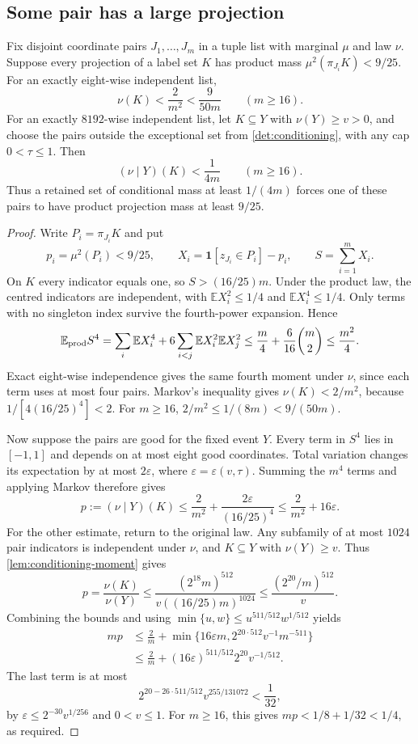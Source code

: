 \documentclass[11pt]{article} \usepackage[utf8]{inputenc}
\theoremstyle{plain} \newtheorem{theorem}{Theorem}[section]
\theoremstyle{definition} \newaliascnt{definition}{theorem}
\newcommand{\ind}{\mathbf{1}}
\begin{document}
\subsection{Some pair has a large projection}

\begin{lemma}\label{lem:pair-projections}
Fix disjoint coordinate pairs $J_1,\ldots,J_m$ in a tuple list with marginal
$\mu$ and law $\nu$. Suppose every projection of a label set $K$ has product
mass $\mu^2(\pi_{J_i}K)<9/25$.
For an exactly eight-wise independent list,
\[
\nu(K)<\frac2{m^2}<\frac9{50m}\qquad(m\ge16).
\]
For an exactly $8192$-wise independent list, let $K\subseteq Y$ with
$\nu(Y)\ge v>0$, and choose the pairs outside the exceptional set from
\cref{det:conditioning}, with any cap $0<\tau\le1$. Then
\[
(\nu\mid Y)(K)<\frac1{4m}\qquad(m\ge16).
\]
Thus a retained set of conditional mass at least $1/(4m)$ forces one of
these pairs to have product projection mass at least $9/25$.
\end{lemma}
\begin{proof}
Write $P_i=\pi_{J_i}K$ and put
\[
p_i=\mu^2(P_i)<9/25,\qquad
X_i=\ind[z_{J_i}\in P_i]-p_i,\qquad S=\sum_{i=1}^mX_i.
\]
On $K$ every indicator equals one, so $S>(16/25)m$. Under the product law,
the centred indicators are independent, with
$\mathbb EX_i^2\le1/4$ and $\mathbb EX_i^4\le1/4$. Only terms with no
singleton index survive the fourth-power expansion. Hence
\[
\mathbb E_{\rm prod}S^4
=\sum_i\mathbb EX_i^4+6\sum_{i<j}\mathbb EX_i^2\mathbb EX_j^2
\le\frac m4+\frac6{16}\binom m2\le\frac{m^2}4.
\]
Exact eight-wise independence gives the same fourth moment under $\nu$,
since each term uses at most four pairs. Markov's inequality gives
$\nu(K)<2/m^2$, because $1/[4(16/25)^4]<2$.
For $m\ge16$, $2/m^2\le1/(8m)<9/(50m)$.

Now suppose the pairs are good for the fixed event $Y$. Every term in $S^4$
lies in $[-1,1]$ and depends on at most eight good coordinates. Total
variation changes its expectation by at most $2\varepsilon$, where
$\varepsilon=\varepsilon(v,\tau)$. Summing the $m^4$ terms and applying
Markov therefore gives
\[
p:=(\nu\mid Y)(K)
\le\frac2{m^2}+\frac{2\varepsilon}{(16/25)^4}
\le\frac2{m^2}+16\varepsilon.
\]
For the other estimate, return to the original law. Any subfamily of at most
$1024$ pair indicators is independent under $\nu$, and $K\subseteq Y$ with
$\nu(Y)\ge v$. Thus \cref{lem:conditioning-moment} gives
\[
p=\frac{\nu(K)}{\nu(Y)}
\le\frac{(2^{18}m)^{512}}{v((16/25)m)^{1024}}
\le\frac{(2^{20}/m)^{512}}v.
\]
Combining the bounds and using
$\min\{u,w\}\le u^{511/512}w^{1/512}$ yields
\[
\begin{aligned}
mp&\le\frac2m+
\min\{16\varepsilon m,2^{20\cdot512}v^{-1}m^{-511}\}
\\
&\le\frac2m+(16\varepsilon)^{511/512}2^{20}v^{-1/512}.
\end{aligned}
\]
The last term is at most
\[
2^{20-26\cdot511/512}v^{255/131072}<\frac1{32},
\]
by $\varepsilon\le2^{-30}v^{1/256}$ and $0<v\le1$. For $m\ge16$, this gives
$mp<1/8+1/32<1/4$, as required.
\end{proof}
\end{document}
